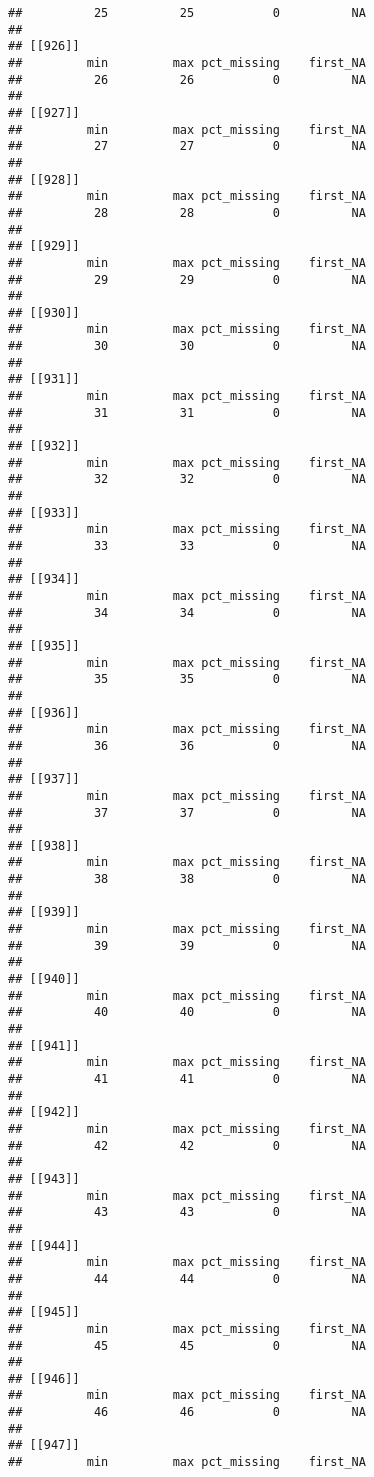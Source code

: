 \documentclass[
]{article}
\begin{document}
\begin{verbatim}
##          25          25           0          NA 
## 
## [[926]]
##         min         max pct_missing    first_NA 
##          26          26           0          NA 
## 
## [[927]]
##         min         max pct_missing    first_NA 
##          27          27           0          NA 
## 
## [[928]]
##         min         max pct_missing    first_NA 
##          28          28           0          NA 
## 
## [[929]]
##         min         max pct_missing    first_NA 
##          29          29           0          NA 
## 
## [[930]]
##         min         max pct_missing    first_NA 
##          30          30           0          NA 
## 
## [[931]]
##         min         max pct_missing    first_NA 
##          31          31           0          NA 
## 
## [[932]]
##         min         max pct_missing    first_NA 
##          32          32           0          NA 
## 
## [[933]]
##         min         max pct_missing    first_NA 
##          33          33           0          NA 
## 
## [[934]]
##         min         max pct_missing    first_NA 
##          34          34           0          NA 
## 
## [[935]]
##         min         max pct_missing    first_NA 
##          35          35           0          NA 
## 
## [[936]]
##         min         max pct_missing    first_NA 
##          36          36           0          NA 
## 
## [[937]]
##         min         max pct_missing    first_NA 
##          37          37           0          NA 
## 
## [[938]]
##         min         max pct_missing    first_NA 
##          38          38           0          NA 
## 
## [[939]]
##         min         max pct_missing    first_NA 
##          39          39           0          NA 
## 
## [[940]]
##         min         max pct_missing    first_NA 
##          40          40           0          NA 
## 
## [[941]]
##         min         max pct_missing    first_NA 
##          41          41           0          NA 
## 
## [[942]]
##         min         max pct_missing    first_NA 
##          42          42           0          NA 
## 
## [[943]]
##         min         max pct_missing    first_NA 
##          43          43           0          NA 
## 
## [[944]]
##         min         max pct_missing    first_NA 
##          44          44           0          NA 
## 
## [[945]]
##         min         max pct_missing    first_NA 
##          45          45           0          NA 
## 
## [[946]]
##         min         max pct_missing    first_NA 
##          46          46           0          NA 
## 
## [[947]]
##         min         max pct_missing    first_NA 

\end{verbatim}
\end{document}
